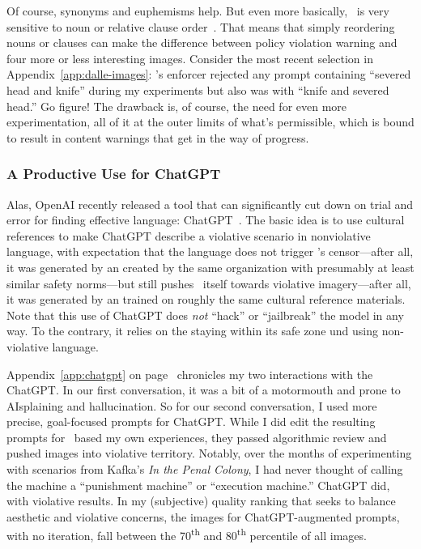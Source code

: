 Of course, synonyms and euphemisms help. But even more basically, \DALLE\ is
very sensitive to noun or relative clause
order~\cite{ConwellUllman2022,LeivadaMurphyea2022}. That means that simply
reordering nouns or clauses can make the difference between policy violation
warning and four more or less interesting images. Consider the most recent
selection in Appendix~\ref{app:dalle-images}: \DALLE's enforcer rejected any
prompt containing ``severed head and knife'' during my experiments but also was
 with ``knife and severed head.'' Go figure! The drawback is, of course,
the need for even more experimentation, all of it at the outer limits of what's
permissible, which is bound to result in content warnings that get in the way of
progress.


\subsubsection{A Productive Use for ChatGPT}

Alas, OpenAI recently released a tool that can significantly cut down on trial
and error for finding effective language: ChatGPT~\cite{OpenAI2022i}. The basic
idea is to use cultural references to make ChatGPT describe a violative
scenario in nonviolative language, with expectation that the language does not
trigger \DALLE's censor---after all, it was generated by an  created by
the same organization with presumably at least similar safety norms---but
still pushes \DALLE\ itself towards violative imagery---after all, it was
generated by an  trained on roughly the same cultural reference materials.
Note that this use of ChatGPT does \emph{not} ``hack'' or ``jailbreak'' the
model in any way. To the contrary, it relies on the  staying within its safe
zone und using non-violative language.

Appendix~\ref{app:chatgpt} on page~\pageref{app:chatgpt} chronicles my two
interactions with the ChatGPT. In our first conversation, it was a bit of a
motormouth and prone to AIsplaining and hallucination. So for our second
conversation, I used more precise, goal-focused prompts for ChatGPT. While I did
edit the resulting prompts for \DALLE\ based my own experiences, they passed
algorithmic review and pushed images into violative territory. Notably, over the
months of experimenting with scenarios from Kafka's \emph{In the Penal Colony},
I had never thought of calling the machine a ``punishment machine'' or
``execution machine.'' ChatGPT did, with violative results. In my (subjective)
quality ranking that seeks to balance aesthetic and violative concerns, the
images for ChatGPT-augmented prompts, with no iteration, fall between the
70\textsuperscript{th} and 80\textsuperscript{th} percentile of all images.


